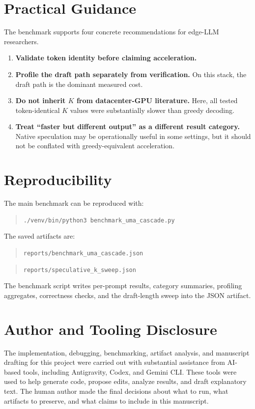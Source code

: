 \documentclass[11pt]{article}
\begin{document}
\section{Practical Guidance}

The benchmark supports four concrete recommendations for edge-LLM researchers.
\begin{enumerate}
    \item \textbf{Validate token identity before claiming acceleration.}
    \item \textbf{Profile the draft path separately from verification.} On this stack, the draft path is the dominant measured cost.
    \item \textbf{Do not inherit $K$ from datacenter-GPU literature.} Here, all tested token-identical $K$ values were substantially slower than greedy decoding.
    \item \textbf{Treat ``faster but different output'' as a different result category.} Native speculation may be operationally useful in some settings, but it should not be conflated with greedy-equivalent acceleration.
\end{enumerate}

\section{Reproducibility}

The main benchmark can be reproduced with:
\begin{quote}
\texttt{./venv/bin/python3 benchmark\_uma\_cascade.py}
\end{quote}

The saved artifacts are:
\begin{quote}
\texttt{reports/benchmark\_uma\_cascade.json}
\end{quote}
\begin{quote}
\texttt{reports/speculative\_k\_sweep.json}
\end{quote}

The benchmark script writes per-prompt results, category summaries, profiling aggregates, correctness checks, and the draft-length sweep into the JSON artifact.

\section{Author and Tooling Disclosure}

The implementation, debugging, benchmarking, artifact analysis, and manuscript drafting for this project were carried out with substantial assistance from AI-based tools, including Antigravity, Codex, and Gemini CLI. These tools were used to help generate code, propose edits, analyze results, and draft explanatory text. The human author made the final decisions about what to run, what artifacts to preserve, and what claims to include in this manuscript.
\end{document}
